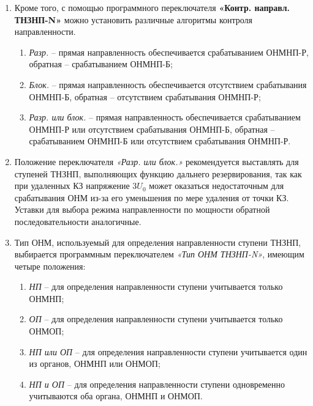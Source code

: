 \begin{enumerate}
\begin{enumerate}
\begin{enumerate}[label=\arabic*)]
    \item \textit{Ненапр.} -- ступень выполнена ненаправленной;
    \item \textit{Прямо} -- ступень выполнена прямонаправленной;
    \item \textit{Обратно} -- ступень выполнена обратнонаправленной.
\end{enumerate}

\item
Кроме того, с помощью программного переключателя \textbf{«Контр. направл. ТНЗНП-N»} можно установить различные алгоритмы контроля направленности.

\begin{enumerate}[label=\arabic*)]
    \item \textit{Разр.} --  прямая направленность обеспечивается срабатыванием ОНМНП-Р, обратная -- срабатыванием ОНМНП-Б;
    \item \textit{Блок.} -- прямая направленность обеспечивается отсутствием срабатывания ОНМНП-Б, обратная -- отсутствием срабатывания ОНМНП-Р;
    \item \textit{Разр. или блок.} -- прямая направленность обеспечивается срабатыванием ОНМНП-Р или отсутствием срабатывания ОНМНП-Б, обратная -- срабатыванием ОНМНП-Б или отсутствием срабатывания ОНМНП-Р.
\end{enumerate}

\item
Положение переключателя \textit{«Разр. или блок.»} рекомендуется выставлять для ступеней ТНЗНП, выполняющих функцию дальнего резервирования, так как при удаленных КЗ напряжение $3U_0$ может оказаться недостаточным для срабатывания ОНМ из-за его уменьшения по мере удаления от точки КЗ. Уставки для выбора режима направленности по мощности обратной последовательности аналогичные.

\item
Тип ОНМ, используемый для определения направленности ступени ТНЗНП, выбирается программным переключателем \textit{«Тип ОНМ ТНЗНП-N»}, имеющим четыре положения:

\begin{enumerate}[label=\arabic*)]
    \item \textit{НП} -- для определения направленности ступени учитывается только ОНМНП;
    \item \textit{ОП} -- для определения направленности ступени учитывается только ОНМОП;
    \item \textit{НП или ОП} -- для определения направленности ступени учитывается один из органов, ОНМНП или ОНМОП;
    \item \textit{НП и ОП} -- для определения направленности ступени одновременно учитываются оба органа, ОНМНП и ОНМОП.
\end{enumerate}


\end{enumerate}
\end{enumerate}
